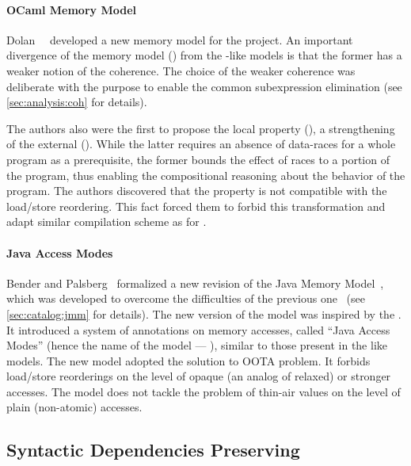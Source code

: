 \paragraph{OCaml Memory Model}

Dolan~\etal~\cite{Dolan-al:PLDI18} developed a new 
memory model for the \MOCaml project. 
An important divergence of the \OCaml memory model (\OCMM)
from the \CMM-like models is that the former 
has a weaker notion of the coherence.
The choice of the weaker coherence was deliberate 
with the purpose to enable the common subexpression elimination
(see \cref{sec:analysis:coh} for details).

The authors also were the first to propose the local \DRF property (\lDRF),
a strengthening of the external \DRF (\eDRF). 
While the latter requires an absence of data-races 
for a whole program as a prerequisite, 
the former bounds the effect of races 
to a portion of the program, thus 
enabling the compositional reasoning 
about the behavior of the program. 
The authors discovered that the \lDRF property 
is not compatible with the load/store reordering.
This fact forced them to forbid this transformation
and adapt similar compilation scheme as for \RCMM. 

\paragraph{Java Access Modes}

Bender and Palsberg~\cite{Bender-Palsberg:OOPSLA19} formalized a new revision 
of the Java Memory Model~\cite{JDK9-VarHandle, JEP:193, JDK9-Modes}, 
which was developed to overcome 
the difficulties of the previous one~\cite{Manson-al:POPL05}
(see \ref{sec:catalog:jmm} for details).
The new version of the model was inspired by the \RCMM. 
It introduced a system of annotations on memory accesses, 
called ``Java Access Modes'' (hence the name of the model --- \JAM),
similar to those present in the \CMM like models.
The new model adopted the \RCMM solution to OOTA problem. 
It forbids load/store reorderings on the level of 
opaque (an analog of \CPP relaxed) or stronger accesses.
The model does not tackle the problem of 
thin-air values on the level of plain (\ie non-atomic) accesses.

\subsection{Syntactic Dependencies Preserving}
\label{sec:catalog:deprf}


